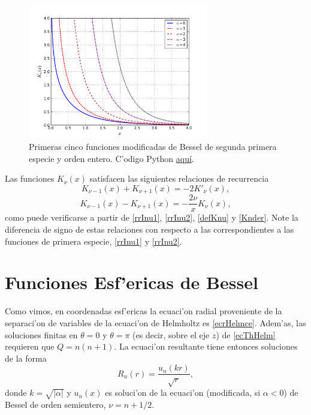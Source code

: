 \begin{figure}[H]
\centering
\includegraphics[angle=0,width=0.7\textwidth]{figs/fig-Bessel-K.pdf}
\caption{Primeras cinco funciones modificadas de Bessel de segunda primera especie y orden entero. C'odigo Python \href{https://github.com/gfrubi/FM2/blob/master/figuras-editables/fig-Bessel.py}{aqu\'i}.}
\label{fig-Kn}
\end{figure}
Las funciones $K_\nu(x)$ satisfacen las siguientes relaciones de recurrencia
\begin{equation}\label{rrKnu1}
K_{\nu-1}(x)+K_{\nu+1}(x)=-2K'_\nu(x),
\end{equation}
\begin{equation}\label{rrKnu2}
K_{\nu-1}(x)-K_{\nu+1}(x)=-\frac{2\nu}{x}K_\nu(x),
\end{equation}
como puede verificarse a partir de \eqref{rrInu1}, \eqref{rrInu2}, \eqref{defKnu} y \eqref{Knder}. Note la diferencia de signo de estas relaciones con respecto a las correspondientes a las funciones de primera especie, \eqref{rrInu1} y \eqref{rrInu2}.

\section{Funciones Esf'ericas de Bessel}
Como vimos, en coordenadas esf'ericas la ecuaci'on radial proveniente de la separaci'on de variables de la ecuaci'on de Helmholtz es \eqref{ecrHelmce}. Adem'as, las soluciones finitas en $\theta=0$ y $\theta=\pi$ (es decir, sobre el eje $z$) de \eqref{ecThHelm} requieren que $Q=n(n+1)$. La ecuaci'on resultante tiene entonces soluciones de la forma
\begin{equation}
R_n(r) = \frac{u_n(kr)}{\sqrt{r}} ,
\end{equation}
donde $k=\sqrt{|\alpha|}$ y $u_n(x)$ es soluci'on de la ecuaci'on (modificada, si $\alpha<0$) de Bessel de orden semientero, $\nu=n+1/2$.

